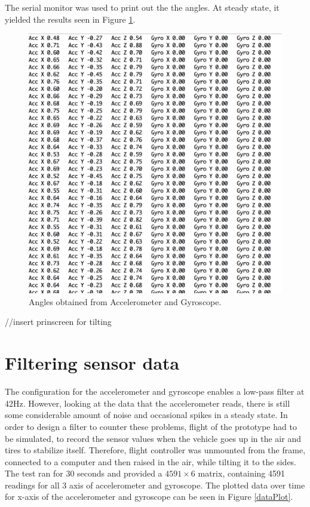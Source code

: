 The serial monitor was used to print out the the angles. At steady state, it yielded the results seen in Figure \ref{angles}.

\begin{figure}[H]
  \centering
    \includegraphics[width=1\textwidth]{images/accgy.png}
	\caption{Angles obtained from Accelerometer and Gyroscope.}
	\label{angles}
\end{figure}

//insert prinscreen for tilting 

\section{Filtering sensor data}
The configuration for the accelerometer and gyroscope enables a low-pass filter at 42Hz. However, looking at the data that the accelerometer reads, there is still some considerable amount of noise and occasional spikes in a steady state. In order to design a filter to counter these problems, flight of the prototype had to be simulated, to record the sensor values when the vehicle goes up in the air and tires to stabilize itself. Therefore, flight controller was unmounted from the frame, connected to a computer and then raised in the air, while tilting it to the sides. The test ran for 30 seconds and provided a $4591\times 6$ matrix, containing 4591 readings for all 3 axis of accelerometer and gyroscope. The plotted data over time for x-axis of the accelerometer and gyroscope can be seen in Figure \ref{dataPlot}.

